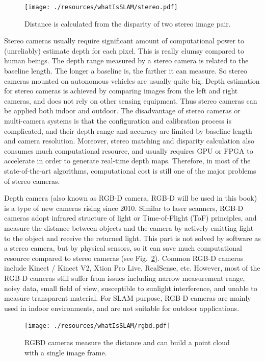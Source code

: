 \begin{figure}
    \centering
    \texttt{[image: ./resources/whatIsSLAM/stereo.pdf]}
    \caption{Distance is calculated from the disparity of two stereo image pair.}
    \label{fig:stereo}
\end{figure}


Stereo cameras usually require significant amount of computational power to (unreliably) estimate depth for each pixel. This is really clumsy compared to human beings. The depth range measured by a stereo camera is related to the baseline length. The longer a baseline is, the farther it can measure. So stereo cameras mounted on autonomous vehicles are usually quite big. Depth estimation for stereo cameras is achieved by comparing images from the left and right cameras, and does not rely on other sensing equipment. Thus stereo cameras can be applied both indoor and outdoor. The disadvantage of stereo cameras or multi-camera systems is that the configuration and calibration process is complicated, and their depth range and accuracy are limited by baseline length and camera resolution. Moreover, stereo matching and disparity calculation also consumes much computational resource, and usually requires GPU or FPGA to accelerate in order to generate real-time depth maps. Therefore, in most of the state-of-the-art algorithms, computational cost is still one of the major problems of stereo cameras.

Depth camera (also known as RGB-D camera, RGB-D will be used in this book) is a type of new cameras rising since 2010. Similar to laser scanners, RGB-D cameras adopt infrared structure of light or Time-of-Flight (ToF) principles, and measure the distance between objects and the camera by actively emitting light to the object and receive the returned light. This part is not solved by software as a stereo camera, but by physical sensors, so it can save much computational resource compared to stereo cameras (see Fig.~\ref{fig:RGBD}). Common RGB-D cameras include Kinect / Kinect V2, Xtion Pro Live, RealSense, etc. However, most of the RGB-D cameras still suffer from issues including narrow measurement range, noisy data, small field of view, susceptible to sunlight interference, and unable to measure transparent material. For SLAM purpose, RGB-D cameras are mainly used in indoor environments, and are not suitable for outdoor applications.
\begin{figure}
    \centering
    \texttt{[image: ./resources/whatIsSLAM/rgbd.pdf]}
    \caption{RGBD cameras measure the distance and can build a point cloud with a single image frame.}
    \label{fig:RGBD}
\end{figure}

